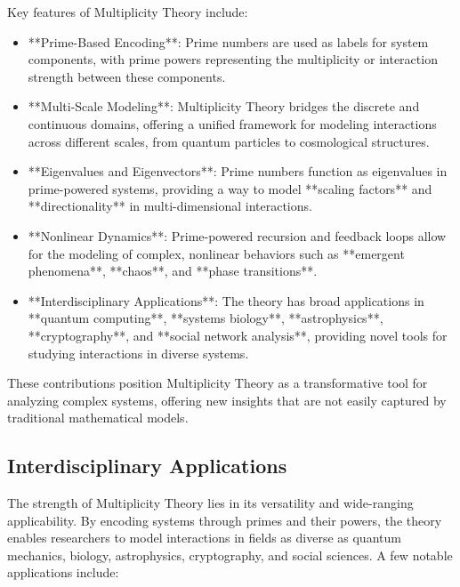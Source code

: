 \documentclass[12pt]{article}
\begin{document}
Key features of Multiplicity Theory include:
\begin{itemize}
    \item **Prime-Based Encoding**: Prime numbers are used as labels for system components, with prime powers representing the multiplicity or interaction strength between these components.
    \item **Multi-Scale Modeling**: Multiplicity Theory bridges the discrete and continuous domains, offering a unified framework for modeling interactions across different scales, from quantum particles to cosmological structures.
    \item **Eigenvalues and Eigenvectors**: Prime numbers function as eigenvalues in prime-powered systems, providing a way to model **scaling factors** and **directionality** in multi-dimensional interactions.
    \item **Nonlinear Dynamics**: Prime-powered recursion and feedback loops allow for the modeling of complex, nonlinear behaviors such as **emergent phenomena**, **chaos**, and **phase transitions**.
    \item **Interdisciplinary Applications**: The theory has broad applications in **quantum computing**, **systems biology**, **astrophysics**, **cryptography**, and **social network analysis**, providing novel tools for studying interactions in diverse systems.
\end{itemize}

These contributions position Multiplicity Theory as a transformative tool for analyzing complex systems, offering new insights that are not easily captured by traditional mathematical models.

\subsection{Interdisciplinary Applications}

The strength of Multiplicity Theory lies in its versatility and wide-ranging applicability. By encoding systems through primes and their powers, the theory enables researchers to model interactions in fields as diverse as quantum mechanics, biology, astrophysics, cryptography, and social sciences. A few notable applications include:
\end{document}
